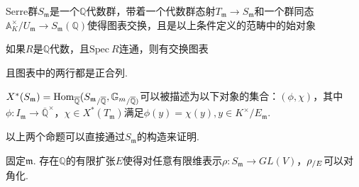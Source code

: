 \begin{cdef}
    Serre群$S_{\mathfrak{m}}$是一个$\mathbb{Q}$代数群，带着一个代数群态射$T_{\mathfrak{m}}\to S_{\mathfrak{m}}$和一个群同态$\mathbb{A}_K^{\times}/U_{\mathfrak{m}}\to S_{\mathfrak{m}}(\mathbb{Q})$使得图表交换，且是以上条件定义的范畴中的始对象
    \begin{figure}[H]
        \centering
    \end{figure}
\end{cdef}

\begin{cprop}
    如果$R$是$\mathbb{Q}$代数，且$\mathrm{Spec}\ R$连通，则有交换图表
    \begin{figure}[H]
        \centering
    \end{figure}
    且图表中的两行都是正合列.
\end{cprop}

\begin{cprop}
    $X^{*}(S_{\mathfrak{m}}) = \mathrm{Hom}_{\overline{\mathbb{Q}}}({S_{\mathfrak{m}}}_{/\overline{\mathbb{Q}}}, {\mathbb{G}_{m}}_{/\overline{\mathbb{Q}})}$可以被描述为以下对象的集合：$(\phi, \chi)$，其中$\phi: I_{\mathfrak{m}}\to \overline{\mathbb{Q}}^{\times}$，$\chi\in X^{*}(T_{\mathfrak{m}})$满足$\phi(y) = \chi(y), y\in K^{\times}/ E_{\mathfrak{m}}$.
\end{cprop}

以上两个命题可以直接通过$S_{\mathfrak{m}}$的构造来证明.

\begin{cprop}
    固定$\mathfrak{m}$. 存在$\mathbb{Q}$的有限扩张$E$使得对任意有限维表示$\rho:S_{\mathfrak{m}}\to GL(V)$，${\rho}_{/E}$可以对角化. \label{reps::split_finite}
\end{cprop}

